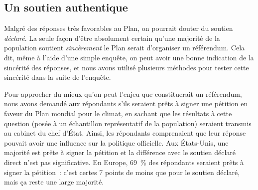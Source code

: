 \documentclass[a5paper,french,openany]{memoir}
\begin{document}
\subsection{Un soutien authentique} %

Malgré des réponses très favorables au Plan, on pourrait douter du soutien \textit{déclaré}. 
La seule façon d'être absolument certain qu'une majorité de la population soutient \textit{sincèrement} le Plan serait d'organiser un référendum. Cela dit, même à l'aide d'une simple enquête, on peut avoir une bonne indication de la sincérité des réponses, et nous avons utilisé plusieurs méthodes pour tester cette sincérité dans la suite de l'enquête.

Pour approcher du mieux qu'on peut l'enjeu que constituerait un référendum, nous avons demandé aux répondants s'ils seraient prêts à signer une pétition en faveur du Plan mondial pour le climat, en sachant que les résultats à cette question (posée à un échantillon représentatif de la population) seraient transmis au cabinet du chef d'État. Ainsi, les répondants comprenaient que leur réponse pouvait avoir une influence sur la politique officielle. Aux États-Unis, une majorité est prête à signer la pétition et la différence avec le soutien déclaré direct n'est pas significative. En Europe, 69~\% des répondants seraient prêts à signer la pétition~: c'est certes 7 points de moins que pour le soutien déclaré, mais ça reste une large majorité. 
\end{document}
